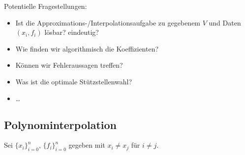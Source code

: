 \documentclass[11pt]{scrartcl}
\begin{document}
Potentielle Fragestellungen:
\begin{itemize}
	\item 
		Ist die Approximations-/Interpolationsaufgabe zu gegebenem $V$ und Daten $(x_i,f_i)$ lösbar? eindeutig?
	\item
		Wie finden wir algorithmisch die Koeffizienten?
	\item
		Können wir Fehleraussagen treffen?
	\item
		Was ist die optimale Stützstellenwahl?
	\item
		\dots
\end{itemize}


\subsection{Polynominterpolation}

Sei $\{x_i\}_{i=0}^n$, $\{f_i\}_{i=0}^n$ gegeben mit $x_i\neq x_j$ für $i\neq j$.
\end{document}

